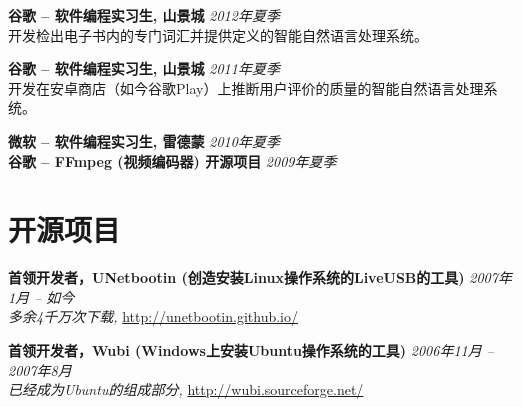 \documentclass[margin,line]{resume}
\begin{document}
\begin{resume}
\textbf{谷歌 -- 软件编程实习生, 山景城} \hfill \textsl{2012年夏季}\\
开发检出电子书内的专门词汇并提供定义的智能自然语言处理系统。

\textbf{谷歌 -- 软件编程实习生, 山景城} \hfill \textsl{2011年夏季}\\
开发在安卓商店（如今谷歌Play）上推断用户评价的质量的智能自然语言处理系统。

\textbf{微软 -- 软件编程实习生, 雷德蒙} \hfill \textsl{2010年夏季}\\
\textbf{谷歌 -- FFmpeg (视频编码器) 开源项目} \hfill \textsl{2009年夏季}\\



\vspace{-3mm}

\section{\mysidestyle 开源项目}

\textbf{首领开发者，UNetbootin (创造安装Linux操作系统的LiveUSB的工具)} \hfill \textsl{2007年1月 -- 如今}\\
\emph{多余4千万次下载,} \url{http://unetbootin.github.io/}

\textbf{首领开发者，Wubi (Windows上安装Ubuntu操作系统的工具)} \hfill \textsl{2006年11月 -- 2007年8月}\\
\emph{已经成为Ubuntu的组成部分,} \url{http://wubi.sourceforge.net/}


\end{resume}
\end{document}
